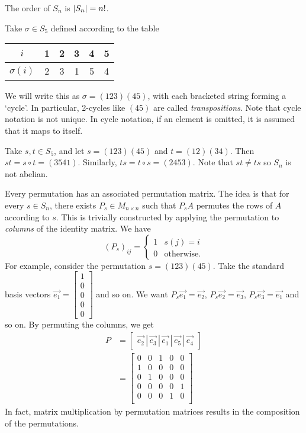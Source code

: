 \begin{remark}
  The order of $S_n$ is $\lvert S_n\rvert = n!$.
\end{remark}

\begin{example}
  Take $\sigma \in S_5$ defined according to the table
  \begin{center}
    \begin{tabular}{c|ccccc}
      $i$ & 1 & 2 & 3 & 4 & 5 \\
      \hline
      $\sigma(i)$ & 2 & 3 & 1 & 5 & 4
    \end{tabular}
  \end{center}
  We will write this as $\sigma = (123)(45)$, with each bracketed string forming a `cycle'. In particular, 2-cycles like $(45)$ are called \emph{transpositions}. Note that cycle notation is not unique. In cycle notation, if an element is omitted, it is assumed that it maps to itself.
\end{example}
\begin{example}
  Take $s, t \in  S_5$, and let $s = (123)(45)$ and $t = (12)(34)$. Then $st = s\circ t = (3541)$. Similarly, $ts = t\circ s = (2453)$. Note that $st \neq ts$ so $S_n$ is not abelian. 
\end{example}

Every permutation has an associated permutation matrix. The idea is that for every $s \in S_n$, there exists $P_s \in M_{n\times n}$ such that $P_sA$ permutes the rows of  $A$ according to $s$. This is trivially constructed by applying the permutation to \textit{columns} of the identity matrix. We have \[
  (P_s)_{ij} = 
  \begin{cases}
    1 &\text{$s(j) = i$} \\
    0 &\text{otherwise.}
  \end{cases}
\] 
For example, consider the permutation $s = (123)(45)$. Take the standard basis vectors  $\vec{e_1} = \begin{bmatrix} 1 \\ 0 \\ 0 \\ 0 \\ 0 \end{bmatrix}$ and so on. We want $P_s \vec{e_1} = \vec{e_2}$, $P_s \vec{e_2} = \vec{e_3}$, $P_s \vec{e_3} = \vec{e_1}$ and so on. By permuting the columns, we get
\begin{align*}
  P &= 
  \begin{bmatrix}
    \vec{e_2} \,|\, \vec{e_3} \,|\, \vec{e_1} \,|\, \vec{e_5} \,|\, \vec{e_4}
  \end{bmatrix} \\
    &=
    \begin{bmatrix}
      0 & 0 & 1 & 0 & 0 \\
      1 & 0 & 0 & 0 & 0 \\
      0 & 1 & 0 & 0 & 0 \\
      0 & 0 & 0 & 0 & 1 \\
      0 & 0 & 0 & 1 & 0 \\
    \end{bmatrix}
\end{align*}
In fact, matrix multiplication by permutation matrices results in the composition of the permutations.


